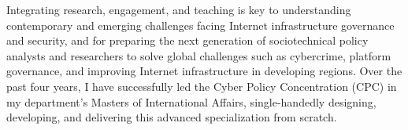 \documentclass[11pt]{letter}
\begin{document}
\begin{letter}
Integrating research, engagement, and teaching is key to understanding contemporary and emerging challenges facing Internet infrastructure governance and security, and for preparing the next generation of sociotechnical policy analysts and researchers to solve global challenges such as cybercrime, platform governance, and improving Internet infrastructure in developing regions.  
%
Over the past four years, I have successfully led the Cyber Policy Concentration (CPC) in my department's Masters of International Affairs,  single-handedly designing, developing, and delivering this advanced specialization from scratch. 
%



\end{letter}
\end{document}
